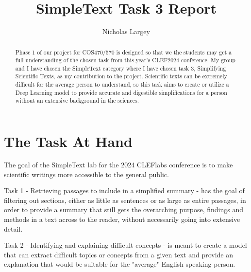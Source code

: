\documentclass[runningheads]{llncs}
\begin{document}
%
\title{SimpleText Task 3 Report}
%
\author{Nicholas Largey}
%
%

%
\maketitle              %
%
\begin{abstract}
Phase 1 of our project for COS470/570 is designed so that we the students may get a 
full understanding of the chosen task from this year's CLEF2024 conference. My group and I
have chosen the SimpleText category where I have chosen task 3, Simplifying Scientific Texts, 
as my contribution to the project. Scientific texts can be extremely difficult for the average
person to understand, so this task aims to create or utilize a Deep Learning model to provide 
accurate and digestible simplifications for a person without an extensive background in the
sciences.
\end{abstract}
%
%
%
\section{The Task At Hand}
The goal of the SimpleText lab for the 2024 CLEFlabs conference is to make scientific writings 
more accessible to the general public. 

Task 1 - Retrieving passages to include in a simplified summary - has the goal of filtering out sections, either as little as sentences or as large as entire passages, in order to provide a summary that still gets the overarching purpose, findings and methods in a text across to the reader, without necessarily going into extensive detail. 

Task 2 - Identifying and explaining difficult concepts - is meant to create a model that can extract difficult topics or concepts from a given text and provide an explanation that would be suitable for the "average" English speaking person. 
\end{document}
